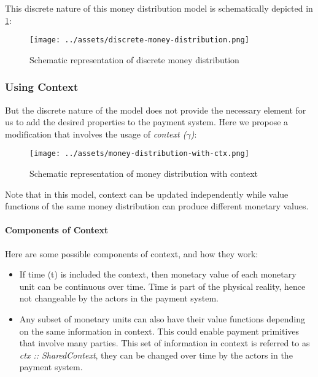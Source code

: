 \documentclass[a4paper,10pt]{report}
\begin{document}
This discrete nature of this money distribution model is schematically depicted in \ref{fig:discrete-md}:

\begin{figure}[h]
    \centering
    \texttt{[image: ../assets/discrete-money-distribution.png]}
    \caption{Schematic representation of discrete money distribution}
    \label{fig:discrete-md}
\end{figure}

\subsubsection{Using Context}

But the discrete nature of the model does not provide the necessary element for us to add the desired properties to the
payment system. Here we propose a modification that involves the usage of \textit{context ($\gamma$)}:

\begin{figure}[h]
    \centering
    \texttt{[image: ../assets/money-distribution-with-ctx.png]}
    \caption{Schematic representation of money distribution with context}
    \label{fig:md-with-ctx}
\end{figure}

Note that in this model, context can be updated independently while value functions of the same money distribution can
produce different monetary values.

\paragraph{Components of Context}

Here are some possible components of context, and how they work:

\begin{itemize}
\item If time (t) is included the context, then monetary value of each monetary unit can be continuous over time. Time
    is part of the physical reality, hence not changeable by the actors in the payment system.
\item Any subset of monetary units can also have their value functions depending on the same information in
    context. This could enable payment primitives that involve many parties. This set of information in context is
    referred to as \textit{ctx :: SharedContext}, they can be changed over time by the actors in the payment system.
\end{itemize}
\end{document}
